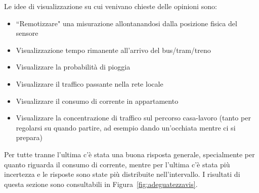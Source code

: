 \documentclass[12pt,a4paper]{report}
\begin{document}
\noindent Le idee di visualizzazione su cui venivano chieste delle opinioni sono:
\begin{itemize}
  \item ``Remotizzare" una misurazione allontanandosi dalla posizione fisica del sensore
  \item Visualizzazione tempo rimanente all'arrivo del bus/tram/treno
  \item Visualizzare la probabilità di pioggia
  \item Visualizzare il traffico passante nella rete locale
  \item Visualizzare il consumo di corrente in appartamento
  \item Visualizzare la concentrazione di traffico sul percorso casa-lavoro (tanto per regolarsi su quando partire, ad esempio dando un'occhiata mentre ci si prepara)
\end{itemize}
Per tutte tranne l'ultima c'è stata una buona risposta generale, specialmente per quanto riguarda il consumo di corrente, mentre per l'ultima
c'è stata più incertezza e le risposte sono state più distribuite nell'intervallo. I risultati di questa sezione sono consultabili in
Figura~\ref{fig:adeguatezzavis}.
\end{document}
